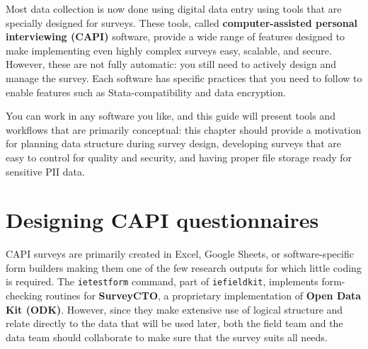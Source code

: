 
\begin{fullwidth}
Most data collection is now done using digital data entry
using tools that are specially designed for surveys.
These tools, called \textbf{computer-assisted personal interviewing (CAPI)} software,
provide a wide range of features designed to make
implementing even highly complex surveys easy, scalable, and secure.
However, these are not fully automatic:
you still need to actively design and manage the survey.
Each software has specific practices that you need to follow
to enable features such as Stata-compatibility and data encryption.

You can work in any software you like,
and this guide will present tools and workflows
that are primarily conceptual:
this chapter should provide a motivation for
planning data structure during survey design,
developing surveys that are easy to control for quality and security,
and having proper file storage ready for sensitive PII data.
\end{fullwidth}


\section{Designing CAPI questionnaires}

CAPI surveys
are primarily created in Excel, Google Sheets,
or software-specific form builders
making them one of the few research outputs for which little coding is required.
The \texttt{ietestform} command, part of
\texttt{iefieldkit}, implements form-checking routines
for \textbf{SurveyCTO}, a proprietary implementation of \textbf{Open Data Kit (ODK)}.
However, since they make extensive use of logical structure and
relate directly to the data that will be used later,
both the field team and the data team should
collaborate to make sure that the survey suits all needs.\cite{krosnick2018questionnaire}

